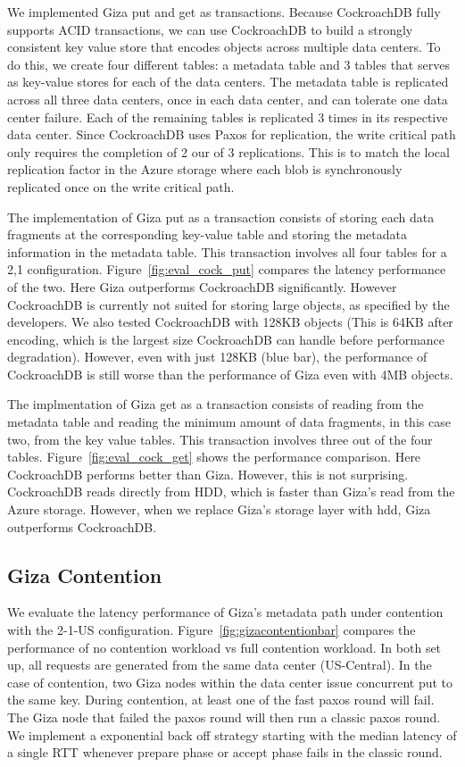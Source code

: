 We implemented Giza put and get as transactions. Because CockroachDB fully supports ACID transactions, we can use CockroachDB to build a strongly consistent key value store that encodes objects across multiple data centers. To do this, we create four different tables: a metadata table and 3 tables that serves as key-value stores for each of the data centers. The metadata table is replicated across all three data centers, once in each data center, and can tolerate one data center failure. Each of the remaining tables is replicated 3 times in its respective data center. Since CockroachDB uses Paxos for replication, the write critical path only requires the completion of 2 our of 3 replications. This is to match the local replication factor in the Azure storage where each blob is synchronously replicated once on the write critical path.

The implementation of Giza put as a transaction consists of storing each data fragments at the corresponding key-value table and storing the metadata information in the metadata table. This transaction involves all four tables for a 2,1 configuration. Figure~\ref{fig:eval_cock_put} compares the latency performance of the two. Here Giza outperforms CockroachDB significantly.
However CockroachDB is currently not suited for storing large objects, as specified by the developers. We also tested CockroachDB with 128KB objects (This is 64KB after encoding, which is the largest size CockroachDB can handle before performance degradation). However, even with just 128KB (blue bar), the performance of CockroachDB is still worse than the performance of Giza even with 4MB objects.

The implmentation of Giza get as a transaction consists of reading from the metadata table and reading the minimum amount of data fragments, in this case two, from the key value tables. This transaction involves three out of the four tables. Figure~\ref{fig:eval_cock_get} shows the performance comparison. Here CockroachDB performs better than Giza. However, this is not surprising. CockroachDB reads directly from HDD, which is faster than Giza's read from the Azure storage. However, when we replace Giza's storage layer with hdd, Giza outperforms CockroachDB.



\subsection{Giza Contention}

We evaluate the latency performance of Giza’s metadata path under contention with the 2-1-US configuration. Figure~\ref{fig:gizacontentionbar} compares the performance of no contention workload vs full contention workload. In both set up, all requests are generated from the same data center (US-Central). In the case of contention, two Giza nodes within the data center issue concurrent put to the same key. During contention, at least one of the fast paxos round will fail. The Giza node that failed the paxos round will then run a classic paxos round. We implement a exponential back off strategy starting with the median latency of a single RTT whenever prepare phase or accept phase fails in the classic round. 

